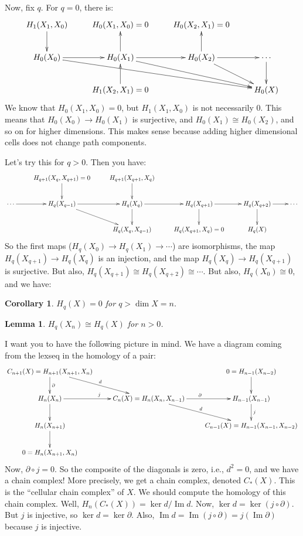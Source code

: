 \documentclass{amsart}
\theoremstyle{theorem}
\newtheorem{lemma}[theorem]{Lemma}
\newtheorem{corollary}[theorem]{Corollary}
\theoremstyle{definition}
\DeclareMathOperator{\img}{Im}
\begin{document}
Now, fix $q$. For $q=0$, there is:
\begin{equation*}
\xymatrix{ H_1(X_1,X_0)\ar[d] & H_0(X_1,X_0)=0 & H_0(X_2,X_1)=0\\
 H_0(X_0)\ar[r]\ar[drrr] & H_0(X_1)\ar[r]\ar[drr]\ar[u] & H_0(X_2)\ar[u]\ar[r]\ar[dr] & \cdots\ar[d]\\
 & H_1(X_2,X_1)=0\ar[u] & & H_0(X)}
\end{equation*}
We know that $ H_0(X_1,X_0)=0$, but $ H_1(X_1,X_0)$ is not necessarily $0$. This means that $ H_0(X_0)\to H_0(X_1)$ is surjective, and $ H_0(X_1)\cong H_0(X_2)$, and so on for higher dimensions. This makes sense because adding higher dimensional cells does not change path components.

Let's try this for $q>0$. Then you have:
\begin{equation*}
\xymatrix{ & H_{q+1}(X_q,X_{q+1})=0\ar[d]& H_{q+1}(X_{q+1},X_q)\ar[d]\\
\ar[r]\cdots & H_q(X_{q-1})\ar[r]\ar[dr] & H_q(X_q)\ar[r]\ar[d] & H_q(X_{q+1})\ar[r]\ar[d] & H_q(X_{q+2})\ar[d]\ar[r] & \cdots\\
& & H_q(X_{q},X_{q-1}) & H_q(X_{q+1},X_q)=0 & H_q(X)}
\end{equation*}
So the first maps ($ H_q(X_0)\to H_q(X_1)\to\cdots$) are isomorphisms, the map $ H_q(X_{q+1})\to H_q(X_q)$ is an injection, and the map $ H_q(X_q)\to H_q(X_{q+1})$ is surjective. But also, $ H_q(X_{q+1})\cong H_q(X_{q+2})\cong \cdots$. But also, $ H_q(X_0)\cong 0$, and we have:
\begin{corollary}
$ H_q(X)=0$ for $q>\dim X=n$.
\end{corollary}
\begin{lemma}
$ H_q(X_n)\cong H_q(X)$ for $n>0$.
\end{lemma}
I want you to have the following picture in mind. We have a diagram coming from the lexseq in the homology of a pair:
\begin{equation*}
\xymatrix{C_{n+1}(X)= H_{n+1}(X_{n+1},X_n)\ar[d]^\partial\ar[dr]^d & & 0= H_{n-1}(X_{n-2})\ar[d]\\
 H_n(X_n)\ar[r]^j\ar[d] & C_n(X)= H_n(X_n,X_{n-1})\ar[r]^\partial\ar[dr]^d & H_{n-1}(X_{n-1})\ar[d]^j\\
 H_n(X_{n+1})\ar[d] & & C_{n-1}(X)= H_{n-1}(X_{n-1},X_{n-2})\\
0 = H_n(X_{n+1},X_n)}
\end{equation*}
Now, $\partial\circ j=0$. So the composite of the diagonals is zero, i.e., $d^2=0$, and we have a chain complex! More precisely, we get a chain complex, denoted $C_\ast(X)$. This is the ``cellular chain complex'' of $X$. We should compute the homology of this chain complex. Well, $ H_n(C_\ast(X))=\ker d/\img d$. Now, $\ker d=\ker (j\circ\partial)$. But $j$ is injective, so $\ker d=\ker\partial$. Also, $\img d=\img(j\circ\partial)=j(\img\partial)$ because $j$ is injective.
\end{document}
